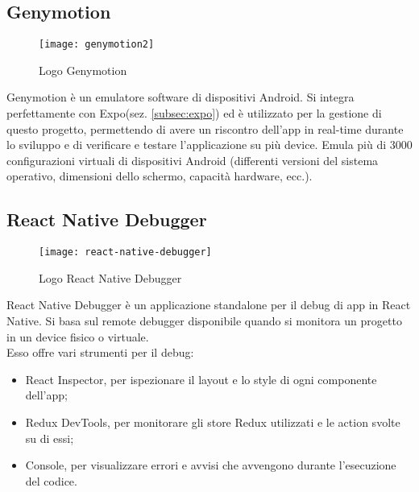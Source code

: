 \subsection{Genymotion}
\begin{figure}[H] 
	\centering
	\texttt{[image: genymotion2]}
	\caption{Logo Genymotion}
\end{figure}
Genymotion è un emulatore software di dispositivi Android. Si integra perfettamente con Expo(sez. \ref{subsec:expo}) ed è utilizzato per la gestione di questo progetto, permettendo di avere un riscontro dell'app in real-time durante lo sviluppo e di verificare e testare l'applicazione su più device. Emula più di 3000 configurazioni virtuali di dispositivi Android (differenti versioni del sistema operativo, dimensioni dello schermo, capacità hardware, ecc.).

\subsection{React Native Debugger}
\begin{figure}[H] 
	\centering
	\texttt{[image: react-native-debugger]}
	\caption{Logo React Native Debugger}
\end{figure}
React Native Debugger è un applicazione standalone per il debug di app in React Native. Si basa sul remote debugger disponibile quando si monitora un progetto in un device fisico o virtuale.\\ Esso offre vari strumenti per il debug:
\begin{itemize}
	\item React Inspector, per ispezionare il layout e lo style di ogni componente dell'app;
	\item Redux DevTools, per monitorare gli store Redux utilizzati e le action svolte su di essi;
	\item Console, per visualizzare errori e avvisi che avvengono durante l'esecuzione del codice.
\end{itemize}


